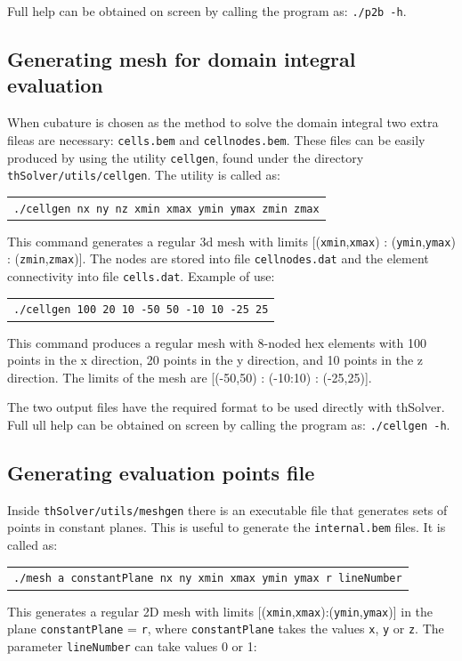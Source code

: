 \documentclass[12pt]{article}
\begin{document}
Full help can be obtained on screen by calling the program as: \texttt{./p2b -h}.

\subsection{Generating mesh for domain integral evaluation}
When cubature is chosen as the method to solve the domain integral two extra fileas are necessary: \verb+cells.bem+ and \verb+cellnodes.bem+. These files can be easily produced by using the utility \verb+cellgen+, found under the directory \verb+thSolver/utils/cellgen+. The utility is called as:

\begin{tabular}{l}
\texttt{./cellgen nx ny nz xmin xmax ymin ymax zmin zmax}
\end{tabular}

This command generates a regular 3d mesh with limits [(\verb+xmin+,\verb+xmax+) : (\verb+ymin+,\verb+ymax+) : (\verb+zmin+,\verb+zmax+)]. The nodes are stored into file \verb+cellnodes.dat+ and the element connectivity into file \verb+cells.dat+. Example of use:

\begin{tabular}{l}
\texttt{./cellgen 100 20 10 -50 50 -10 10 -25 25}
\end{tabular}

This command produces a regular mesh with 8-noded hex elements with 100 points in the x direction, 20 points in the y direction, and 10 points in the z direction. The limits of the mesh are [(-50,50) : (-10:10) : (-25,25)].

The two output files have the required format to be used directly with thSolver. Full ull help can be obtained on screen by calling the program as: \texttt{./cellgen -h}.

\subsection{Generating evaluation points file}\label{meshgen}
Inside \verb+thSolver/utils/meshgen+ there is an executable file that generates sets of points in constant planes. This is useful to generate the \verb+internal.bem+ files. It is called as:

\begin{tabular}{l}
\texttt{./mesh a constantPlane nx ny xmin xmax ymin ymax r lineNumber}
\end{tabular}

This generates a regular 2D mesh with limits [(\verb+xmin+,\verb+xmax+):(\verb+ymin+,\verb+ymax+)] in the plane
\verb+constantPlane+ = \verb+r+, where \verb+constantPlane+ takes the values \verb+x+, \verb+y+ or \verb+z+. The parameter \verb+lineNumber+ can take values 0 or 1:
\end{document}
